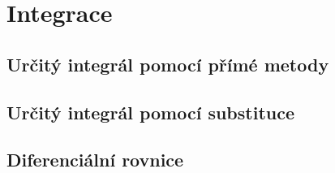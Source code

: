 \section{Integrace}
\subsection{Určitý integrál pomocí přímé metody}


\subsection{Určitý integrál pomocí substituce}


\subsection{Diferenciální rovnice}

